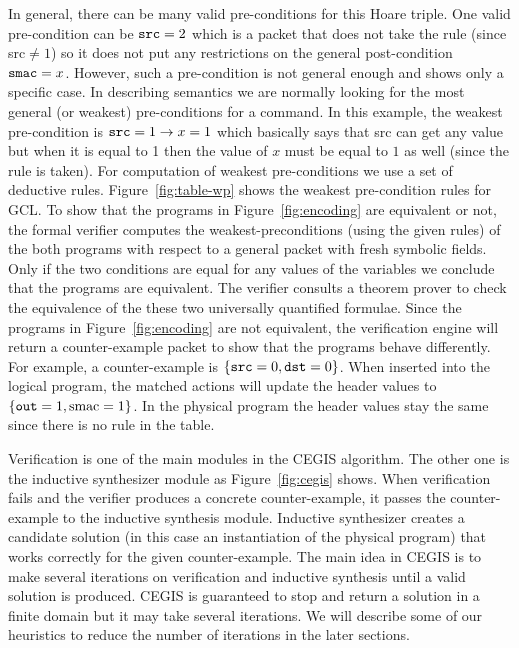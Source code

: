 In general, there can be many valid pre-conditions for this Hoare triple.
One valid pre-condition can be $\mbox{\ttfamily src} = 2$ which is a packet that
does not take the rule (since {\ttfamily src}$\neq1$) 
so it does not put any restrictions on the general post-condition $\mbox{\ttfamily smac} = x$.
However, such a pre-condition is not general enough and shows only a specific case.
In describing semantics we are normally looking for the most general (or weakest)
pre-conditions for a command. 
In this example, the weakest pre-condition is $\mbox{\ttfamily src}=1\rightarrow x = 1$
which basically says that {\ttfamily src} can get any value but when it is equal to 1
then the value of $x$ must be equal to $1$ as well (since the rule is taken).
For computation of weakest pre-conditions we use a set of deductive rules.
Figure~\ref{fig:table-wp} shows the weakest pre-condition rules for GCL.
To show that the programs in Figure~\ref{fig:encoding} are equivalent or not,
the formal verifier computes the weakest-preconditions (using the given rules) 
of the both programs with respect to a general packet with fresh symbolic fields.
Only if the two conditions are equal for any values of the variables we 
conclude that the programs are equivalent.
The verifier consults a theorem prover to check the equivalence of the these two universally quantified formulae.
Since the programs in Figure~\ref{fig:encoding} are not equivalent, 
the verification engine will return a counter-example packet to show that the 
programs behave differently.
For example, a counter-example is $\{\mbox{\ttfamily src}=0,\mbox{\ttfamily dst}=0\}$.
When inserted into the logical program, the matched actions will update the header values to 
$\{\mbox{\ttfamily out}=1,\mbox{smac}=1\}$.
In the physical program the header values stay the same since there is no rule in the table.

Verification is one of the main modules in the CEGIS algorithm.
The other one is the inductive synthesizer module as Figure~\ref{fig:cegis} shows.
When verification fails and the verifier produces a concrete counter-example,
it passes the counter-example to the inductive synthesis module.
Inductive synthesizer creates a candidate solution 
(in this case an instantiation of the physical program)
that works correctly for the given counter-example.
The main idea in CEGIS is to make several iterations on verification and 
inductive synthesis until a valid solution is produced.
CEGIS is guaranteed to stop and return a solution in a finite domain but 
it may take several iterations.
We will describe some of our heuristics to reduce the number of iterations 
in the later sections.

